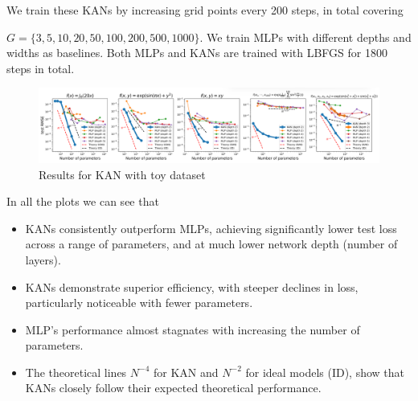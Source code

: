 We train these KANs by increasing grid points every 200 steps, in total covering

$G =\{3, 5, 10, 20, 50, 100, 200, 500, 1000\}$. We train MLPs with different depths and widths as baselines. Both MLPs and KANs are trained with LBFGS for 1800 steps in total.


\begin{figure}[H]
    \centering
    \includegraphics[width=0.95\linewidth]{Images/result.png}
    \caption{Results for KAN with toy dataset}
    \label{fig:re}
\end{figure}

In all the plots we can see that
\begin{itemize}
    \item KANs consistently outperform MLPs, achieving significantly lower test loss across a range of parameters, and at much lower network depth (number of layers).
    \item KANs demonstrate superior efficiency, with steeper declines in loss, particularly noticeable with fewer parameters.
    \item MLP's performance almost stagnates with increasing the number of parameters.
    \item The theoretical lines $N^{-4}$ for KAN and $N^{-2}$ for ideal models (ID), show that KANs closely follow their expected theoretical performance.
\end{itemize}